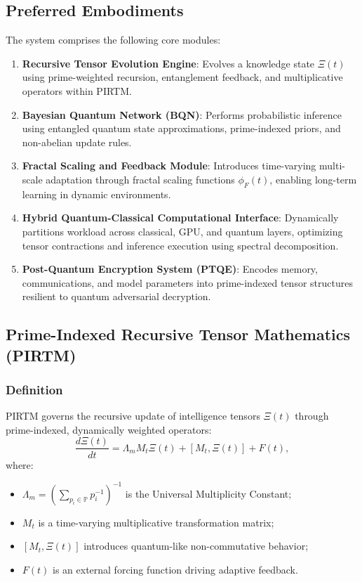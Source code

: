 \documentclass{article}
\theoremstyle{plain}
\theoremstyle{claimstyle}
\begin{document}
\subsection*{Preferred Embodiments}

The system comprises the following core modules:

\begin{enumerate}
    \item \textbf{Recursive Tensor Evolution Engine}: Evolves a knowledge state $\Xi(t)$ using prime-weighted recursion, entanglement feedback, and multiplicative operators within PIRTM.
    
    \item \textbf{Bayesian Quantum Network (BQN)}: Performs probabilistic inference using entangled quantum state approximations, prime-indexed priors, and non-abelian update rules.
    
    \item \textbf{Fractal Scaling and Feedback Module}: Introduces time-varying multi-scale adaptation through fractal scaling functions $\phi_F(t)$, enabling long-term learning in dynamic environments.
    
    \item \textbf{Hybrid Quantum-Classical Computational Interface}: Dynamically partitions workload across classical, GPU, and quantum layers, optimizing tensor contractions and inference execution using spectral decomposition.
    
    \item \textbf{Post-Quantum Encryption System (PTQE)}: Encodes memory, communications, and model parameters into prime-indexed tensor structures resilient to quantum adversarial decryption.
\end{enumerate}

\subsection{Prime-Indexed Recursive Tensor Mathematics (PIRTM)}

\subsubsection{Definition}

PIRTM governs the recursive update of intelligence tensors $\Xi(t)$ through prime-indexed, dynamically weighted operators:
\begin{equation}
\frac{d\Xi(t)}{dt} = \Lambda_m M_t \Xi(t) + [M_t, \Xi(t)] + F(t),
\end{equation}
where:
\begin{itemize}
    \item $\Lambda_m = \left(\sum_{p_i \in \mathbb{P}} p_i^{-1}\right)^{-1}$ is the Universal Multiplicity Constant;
    \item $M_t$ is a time-varying multiplicative transformation matrix;
    \item $[M_t, \Xi(t)]$ introduces quantum-like non-commutative behavior;
    \item $F(t)$ is an external forcing function driving adaptive feedback.
\end{itemize}
\end{document}
